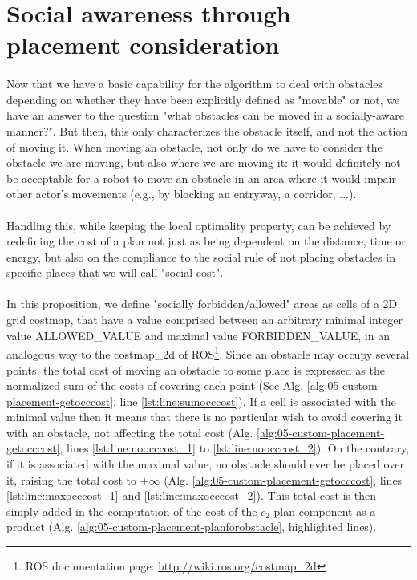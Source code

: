 \section{Social awareness through placement consideration}\label{social_appendix_placement_section}

\paragraph{} Now that we have a basic capability for the algorithm to deal with obstacles depending on whether they have been explicitly defined as "movable" or not, we have an answer to the question "what obstacles can be moved in a socially-aware manner?". But then, this only characterizes the obstacle itself, and not the action of moving it. When moving an obstacle, not only do we have to consider the obstacle we are moving, but also where we are moving it: it would definitely not be acceptable for a robot to move an obstacle in an area where it would impair other actor's movements (e.g., by blocking an entryway, a corridor, ...).

\paragraph{} Handling this, while keeping the local optimality property, can be achieved by redefining the cost of a plan not just as being dependent on the distance, time or energy, but also on the compliance to the social rule of not placing obstacles in specific places that we will call "social cost".

\paragraph{} In this proposition, we define "socially forbidden/allowed" areas as cells of a 2D grid costmap, that have a value comprised between an arbitrary minimal integer value ALLOWED\_VALUE and maximal value FORBIDDEN\_VALUE, in an analogous way to the costmap_2d of ROS\footnote{ROS documentation page: \url{http://wiki.ros.org/costmap_2d}}. Since an obstacle may occupy several points, the total cost of moving an obstacle to some place is expressed as the normalized sum of the costs of covering each point (See Alg. \ref{alg:05-custom-placement-getocccost}, line \ref{lst:line:sumocccost}). If a cell is associated with the minimal value then it means that there is no particular wish to avoid covering it with an obstacle, not affecting the total cost (Alg. \ref{alg:05-custom-placement-getocccost}, lines \ref{lst:line:noocccost_1} to \ref{lst:line:noocccost_2}). On the contrary, if it is associated with the maximal value, no obstacle should ever be placed over it, raising the total cost to $+\infty$ (Alg. \ref{alg:05-custom-placement-getocccost}, lines \ref{lst:line:maxocccost_1} and \ref{lst:line:maxocccost_2}). This total cost is then simply added in the computation of the cost of the $c_{2}$ plan component as a product (Alg. \ref{alg:05-custom-placement-planforobstacle}, highlighted lines).

